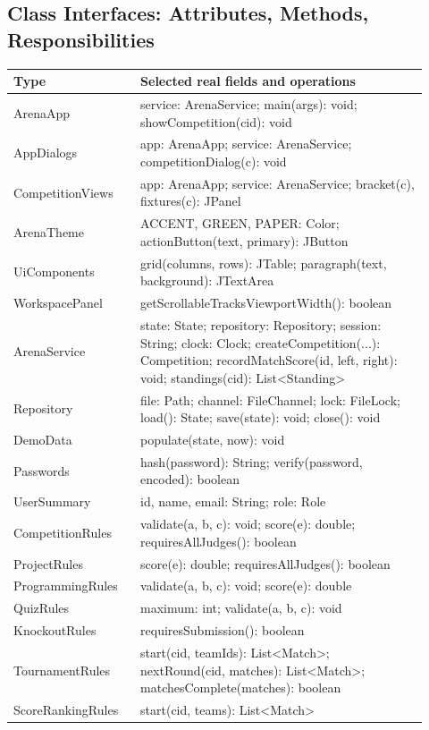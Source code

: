\documentclass[12pt]{article}
\begin{document}
\subsection{Class Interfaces: Attributes, Methods, Responsibilities}
\small
\begin{longtable}{p{0.28\linewidth}p{0.64\linewidth}}\toprule Type & Selected real fields and operations\\\midrule\endhead
ArenaApp & service: ArenaService; main(args): void; showCompetition(cid): void\\
AppDialogs & app: ArenaApp; service: ArenaService; competitionDialog(c): void\\
CompetitionViews & app: ArenaApp; service: ArenaService; bracket(c), fixtures(c): JPanel\\
ArenaTheme & ACCENT, GREEN, PAPER: Color; actionButton(text, primary): JButton\\
UiComponents & grid(columns, rows): JTable; paragraph(text, background): JTextArea\\
WorkspacePanel & getScrollableTracksViewportWidth(): boolean\\
ArenaService & state: State; repository: Repository; session: String; clock: Clock; createCompetition(...): Competition; recordMatchScore(id, left, right): void; standings(cid): List<Standing>\\
Repository & file: Path; channel: FileChannel; lock: FileLock; load(): State; save(state): void; close(): void\\
DemoData & populate(state, now): void\\
Passwords & hash(password): String; verify(password, encoded): boolean\\
UserSummary & id, name, email: String; role: Role\\
CompetitionRules & validate(a, b, c): void; score(e): double; requiresAllJudges(): boolean\\
ProjectRules & score(e): double; requiresAllJudges(): boolean\\
ProgrammingRules & validate(a, b, c): void; score(e): double\\
QuizRules & maximum: int; validate(a, b, c): void\\
KnockoutRules & requiresSubmission(): boolean\\
TournamentRules & start(cid, teamIds): List<Match>; nextRound(cid, matches): List<Match>; matchesComplete(matches): boolean\\
ScoreRankingRules & start(cid, teams): List<Match>\\

\end{longtable}
\end{document}
